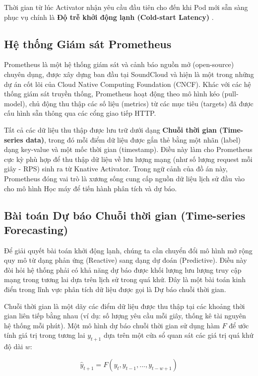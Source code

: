 Thời gian từ lúc Activator nhận yêu cầu đầu tiên cho đến khi Pod mới sẵn sàng phục vụ chính là \textbf{Độ trễ khởi động lạnh (Cold-start Latency)} \cite{wang2018peeking}.

\subsection{Hệ thống Giám sát Prometheus}
Prometheus là một hệ thống giám sát và cảnh báo nguồn mở (open-source) chuyên dụng, được xây dựng ban đầu tại SoundCloud và hiện là một trong những dự án cốt lõi của Cloud Native Computing Foundation (CNCF). Khác với các hệ thống giám sát truyền thống, Prometheus hoạt động theo mô hình kéo (pull-model), chủ động thu thập các số liệu (metrics) từ các mục tiêu (targets) đã được cấu hình sẵn thông qua các cổng giao tiếp HTTP.

Tất cả các dữ liệu thu thập được lưu trữ dưới dạng \textbf{Chuỗi thời gian (Time-series data)}, trong đó mỗi điểm dữ liệu được gắn thẻ bằng một nhãn (label) dạng key-value và một mốc thời gian (timestamp). Điều này làm cho Prometheus cực kỳ phù hợp để thu thập dữ liệu về lưu lượng mạng (như số lượng request mỗi giây - RPS) sinh ra từ Knative Activator. Trong ngữ cảnh của đồ án này, Prometheus đóng vai trò là xương sống cung cấp nguồn dữ liệu lịch sử đầu vào cho mô hình Học máy để tiến hành phân tích và dự báo.

\subsection{Bài toán Dự báo Chuỗi thời gian (Time-series Forecasting)}
Để giải quyết bài toán khởi động lạnh, chúng ta cần chuyển đổi mô hình mở rộng quy mô từ dạng phản ứng (Reactive) sang dạng dự đoán (Predictive). Điều này đòi hỏi hệ thống phải có khả năng dự báo được khối lượng lưu lượng truy cập mạng trong tương lai dựa trên lịch sử trong quá khứ. Đây là một bài toán kinh điển trong lĩnh vực phân tích dữ liệu được gọi là Dự báo chuỗi thời gian.

Chuỗi thời gian là một dãy các điểm dữ liệu được thu thập tại các khoảng thời gian liên tiếp bằng nhau (ví dụ: số lượng yêu cầu mỗi giây, thống kê tài nguyên hệ thống mỗi phút). Một mô hình dự báo chuỗi thời gian sử dụng hàm $F$ để ước tính giá trị trong tương lai $y_{t+1}$ dựa trên một cửa sổ quan sát các giá trị quá khứ độ dài $w$:

\begin{equation}
    \hat{y}_{t+1} = F(y_t, y_{t-1}, ..., y_{t-w+1})
\end{equation}

